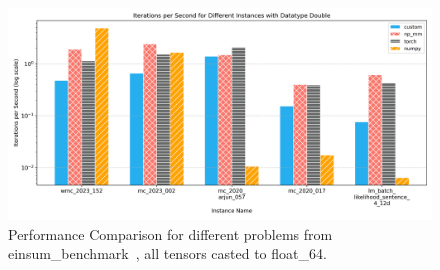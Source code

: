 \begin{figure}[h]
    \label{pic:double}
    \centering
    \includegraphics[width=1\textwidth]{images/Datatype_Double.png}  %
    \caption{Performance Comparison for different problems from einsum\_benchmark~\cite{blacher2024einsum}, all tensors casted to float\_64.}
\end{figure}

\endgroup